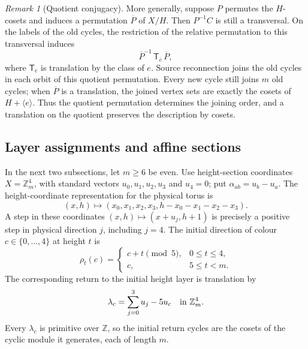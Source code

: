\documentclass[11pt,reqno]{amsart}
\numberwithin{equation}{section}
\theoremstyle{definition}
\theoremstyle{remark}
\newtheorem{remark}[theorem]{Remark}
\newcommand{\Zm}{\mathbb Z_m}
\newcommand{\Z}{\mathbb Z}
\newcommand{\tr}{\mathsf T}
\begin{document}
\begin{remark}[Quotient conjugacy]\label{rem:quotient-conjugacy}
More generally, suppose $P$ permutes the $H$-cosets and induces a permutation
$\overline P$ of $X/H$. Then $P^{-1}C$ is still a transversal. On the labels of
the old cycles, the restriction of the relative permutation to this transversal induces
\[
 \overline P^{-1}\,\tr_{\overline e}\,\overline P,
\]
where $\tr_{\overline e}$ is translation by the class of $e$.
Source reconnection joins the old cycles in each orbit of this quotient permutation.
Every new cycle still joins $m$ old cycles; when $\overline P$ is a translation,
the joined vertex sets are exactly the cosets of $H+\langle e\rangle$.
Thus the quotient permutation determines the joining order, and a
translation on the quotient preserves the description by cosets.
\end{remark}

\subsection{Layer assignments and affine sections}
In the next two subsections, let $m\ge6$ be even. Use height-section coordinates
$X=\Zm^4$, with standard vectors $u_0,u_1,u_2,u_3$ and $u_4=0$; put
$\alpha_{ab}=u_b-u_a$. The height-coordinate representation for the physical torus is
\[
 (x,h)\longmapsto
 (x_0,x_1,x_2,x_3,h-x_0-x_1-x_2-x_3).
\]
A step in these coordinates $(x,h)\mapsto(x+u_j,h+1)$ is precisely a positive step in
physical direction $j$, including $j=4$.
The initial direction of colour $c\in\{0,\ldots,4\}$ at height $t$ is
\begin{equation}\label{eq:d5-neutral}
 \rho_t(c)=\begin{cases}c+t\pmod5,&0\le t\le4,\\c,&5\le t<m.\end{cases}
\end{equation}
The corresponding return to the initial height layer is translation by
\[
 \lambda_c=\sum_{j=0}^3u_j-5u_c\quad\hbox{in }\Zm^4.
\]
Every $\lambda_c$ is primitive over $\Z$, so the initial return cycles are the
cosets of the cyclic module it generates, each of length $m$.
\end{document}
